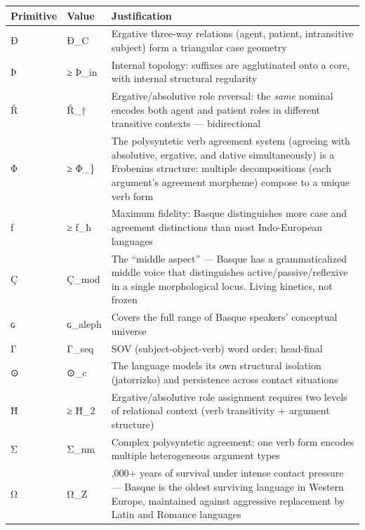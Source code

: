 {\def\LTcaptype{none} %
\begin{longtable}[]{@{}
  >{\raggedright\arraybackslash}p{}
  >{\raggedright\arraybackslash}p{}
  >{\raggedright\arraybackslash}p{}@{}}
\toprule\noalign{}
\begin{minipage}[b]{\linewidth}\raggedright
Primitive
\end{minipage} & \begin{minipage}[b]{\linewidth}\raggedright
Value
\end{minipage} & \begin{minipage}[b]{\linewidth}\raggedright
Justification
\end{minipage} \\
\midrule\noalign{}
\endhead
\bottomrule\noalign{}
\endlastfoot
Ð & Ð\_C & Ergative three-way relations (agent, patient, intransitive
subject) form a triangular case geometry \\
Þ & ≥ Þ\_in & Internal topology: suffixes are agglutinated onto a core,
with internal structural regularity \\
Ř & Ř\_† & Ergative/absolutive role reversal: the \emph{same} nominal
encodes both agent and patient roles in different transitive contexts
--- bidirectional \\
Φ & ≥ Φ\_\} & The polysyntetic verb agreement system (agreeing with
absolutive, ergative, and dative simultaneously) is a Frobenius
structure: multiple decompositions (each argument's agreement morpheme)
compose to a unique verb form \\
ƒ & ≥ ƒ\_ħ & Maximum fidelity: Basque distinguishes more case and
agreement distinctions than most Indo-European languages \\
Ç & Ç\_mod & The ``middle aspect'' --- Basque has a grammaticalized
middle voice that distinguishes active/passive/reflexive in a single
morphological locus. Living kinetics, not frozen \\
ɢ & ɢ\_aleph & Covers the full range of Basque speakers' conceptual
universe \\
Γ & Γ\_seq & SOV (subject-object-verb) word order; head-final \\
⊙ & ⊙\_c & The language models its own structural isolation (jatorrizko)
and persistence across contact situations \\
Ħ & ≥ Ħ\_2 & Ergative/absolutive role assignment requires two levels of
relational context (verb transitivity + argument structure) \\
Σ & Σ\_nm & Complex polysyntetic agreement: one verb form encodes
multiple heterogeneous argument types \\
Ω & Ω\_Z & 2,000+ years of survival under intense contact pressure ---
Basque is the oldest surviving language in Western Europe, maintained
against aggressive replacement by Latin and Romance languages \\
\end{longtable}
}

